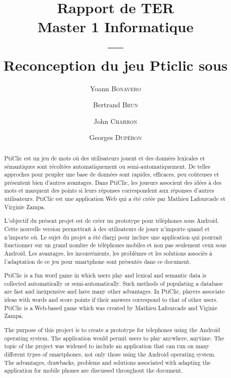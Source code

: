 \documentclass[a4paper,11pt,french]{article}
\title{Rapport de TER
\\Master 1 Informatique
\\---\\
Reconception du jeu Pticlic sous \android{}}
\author{Yoann \textsc{Bonavero} \and Bertrand \textsc{Brun} \and John \textsc{Charron} \and Georges \textsc{Dupéron}}
\def\android{Android\texttrademark{}}
\begin{document}
\maketitle

\pagestyle{empty}
\thispagestyle{empty}

\tableofcontents


\pagestyle{empty}
\thispagestyle{empty}
\newpage
{}
\setcounter{page}{1}
\pagestyle{plain}

\begin{abstract}
  PtiClic est un jeu de mots où des utilisateurs jouent et des données lexicales et sémantiques sont récoltées automatiquement ou
  semi-automatiquement. De telles approches pour peupler une base de données sont rapides, efficaces, peu coûteuses et présentent bien
  d'autres avantages. Dans PtiClic, les joueurs associent des idées à des mots et marquent des points si leurs réponses correspondent aux
  réponses d'autres utilisateurs. PtiClic est une application Web qui a été créée par Mathieu Lafourcade et Virginie Zampa.

  L'objectif du présent projet est de créer un prototype pour téléphones sous \android{}. Cette nouvelle version permettrait à des utilisateurs
  de jouer n'importe quand et n'importe où. Le sujet du projet a été élargi pour inclure une application qui pourrait fonctionner sur un
  grand nombre de téléphones mobiles et non pas seulement ceux sous \android{}. Les avantages, les inconvénients, les problèmes et les
  solutions associés à l'adaptation de ce jeu pour smartphone sont présentés dans ce document.
\end{abstract}

\begin{abstract}
  PtiClic is a fun word game in which users play and lexical and semantic data is collected automatically or semi-automatically. Such
  methods of populating a database are fast and inexpensive and have many other advantages. In PtiClic, players associate ideas with words
  and score points if their answers correspond to that of other users. PtiClic is a Web-based game which was created by Mathieu Lafourcade
  and Viginie Zampa.

  The purpose of this project is to create a prototype for telephones using the \android{} operating system. The application would permit users
  to play anywhere, anytime. The topic of the project was widened to include an application that can run on many different types of
  smartphones, not only those using the \android{} operating system. The advantages, drawbacks, problems and solutions associated with adapting
  the application for mobile phones are discussed throughout the document.
\end{abstract}
\pagebreak
\end{document}
